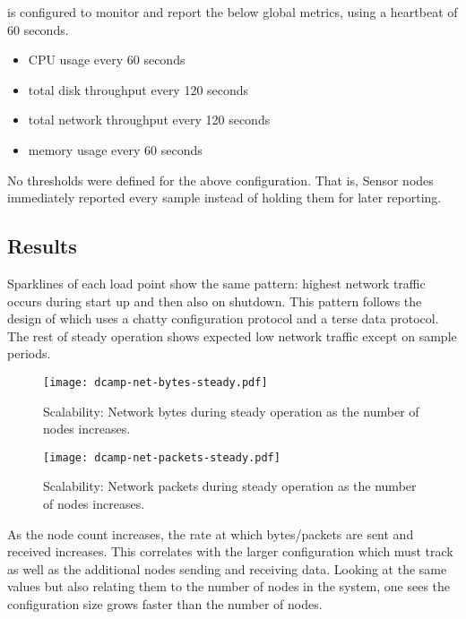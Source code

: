 \dcamp is configured to monitor and report the below global metrics, using a heartbeat of 60 seconds.

\begin{itemize}
\item CPU usage every 60 seconds
\item total disk throughput every 120 seconds
\item total network throughput every 120 seconds
\item memory usage every 60 seconds
\end{itemize}

No thresholds were defined for the above configuration. That is, Sensor nodes immediately reported every sample instead
of holding them for later reporting.

\subsection{Results}

Sparklines of each load point show the same pattern: highest network traffic occurs during start up and then also on
shutdown. This pattern follows the design of \dcamp which uses a chatty configuration protocol and a terse data
protocol. The rest of steady operation shows expected low network traffic except on sample periods.

\begin{figure}[H]
    \centering
    \vspace{-20pt}
    \texttt{[image: dcamp-net-bytes-steady.pdf]}
    \vspace{-40pt}
    \caption[Scalability: Steady State Network Bytes]
            {Scalability: Network bytes during steady operation as the number of \dcamp nodes increases.}
    \label{fig:net_bytes_steady_graph}
\end{figure}

\begin{figure}[H]
    \centering
    \vspace{-20pt}
    \texttt{[image: dcamp-net-packets-steady.pdf]}
    \vspace{-40pt}
    \caption[Scalability: Steady State Network Packets]
	    {Scalability: Network packets during steady operation as the number of \dcamp nodes increases.}
    \label{fig:net_packets_steady_graph}
\end{figure}

As the node count increases, the rate at which bytes/packets are sent and received increases. This correlates with the
larger configuration which \dcamp must track as well as the additional nodes sending and receiving data. Looking at the
same values but also relating them to the number of nodes in the system, one sees the configuration size grows faster
than the number of nodes.

